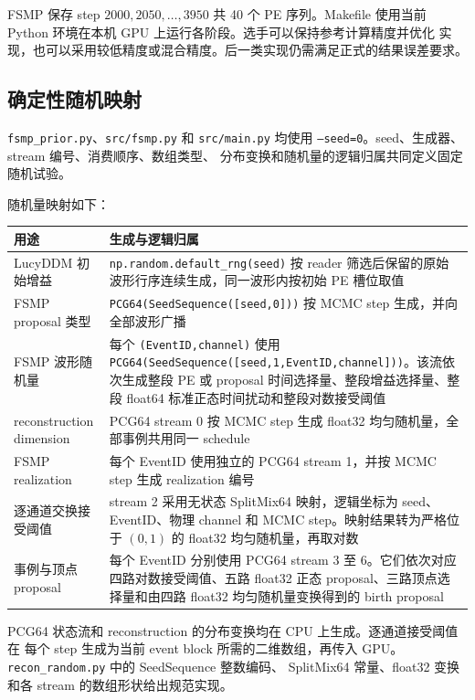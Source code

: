 \documentclass[UTF8,a4paper,11pt]{ctexart}
\begin{document}
FSMP 保存 step \(2000,2050,\ldots,3950\) 共 40 个 PE 序列。Makefile 使用当前 Python 环境在本机 GPU 上运行各阶段。选手可以保持参考计算精度并优化
实现，也可以采用较低精度或混合精度。后一类实现仍需满足正式的结果误差要求。

\subsection{确定性随机映射}

\texttt{fsmp\_prior.py}、\texttt{src/fsmp.py} 和 \texttt{src/main.py} 均使用
\texttt{--seed=0}。seed、生成器、stream 编号、消费顺序、数组类型、
分布变换和随机量的逻辑归属共同定义固定随机试验。

随机量映射如下：

\begingroup
\small
\begin{longtable}[]{@{}L{0.25\textwidth}L{0.68\textwidth}@{}}
\toprule\noalign{}
用途 & 生成与逻辑归属 \\
\midrule\noalign{}
\endhead
\bottomrule\noalign{}
\endlastfoot
LucyDDM 初始增益 & \texttt{np.random.default\_rng(seed)} 按 reader 筛选后保留的原始波形行序连续生成，同一波形内按初始 PE 槽位取值 \\
FSMP proposal 类型 & \texttt{PCG64(SeedSequence([seed,0]))} 按 MCMC step 生成，并向全部波形广播 \\
FSMP 波形随机量 & 每个 \texttt{(EventID,channel)} 使用 \texttt{PCG64(SeedSequence([seed,1,EventID,channel]))}。该流依次生成整段 PE 或 proposal 时间选择量、整段增益选择量、整段 float64 标准正态时间扰动和整段对数接受阈值 \\
reconstruction dimension & PCG64 stream 0 按 MCMC step 生成 float32 均匀随机量，全部事例共用同一 schedule \\
FSMP realization & 每个 EventID 使用独立的 PCG64 stream 1，并按 MCMC step 生成 realization 编号 \\
逐通道交换接受阈值 & stream 2 采用无状态 SplitMix64 映射，逻辑坐标为 seed、EventID、物理 channel 和 MCMC step。映射结果转为严格位于 \((0,1)\) 的 float32 均匀随机量，再取对数 \\
事例与顶点 proposal & 每个 EventID 分别使用 PCG64 stream 3 至 6。它们依次对应四路对数接受阈值、五路 float32 正态 proposal、三路顶点选择量和由四路 float32 均匀随机量变换得到的 birth proposal \\
\end{longtable}
\endgroup

PCG64 状态流和 reconstruction 的分布变换均在 CPU 上生成。逐通道接受阈值在
每个 step 生成为当前 event block 所需的二维数组，再传入 GPU。
\texttt{recon\_random.py} 中的 SeedSequence 整数编码、
SplitMix64 常量、float32 变换和各 stream 的数组形状给出规范实现。
\end{document}
